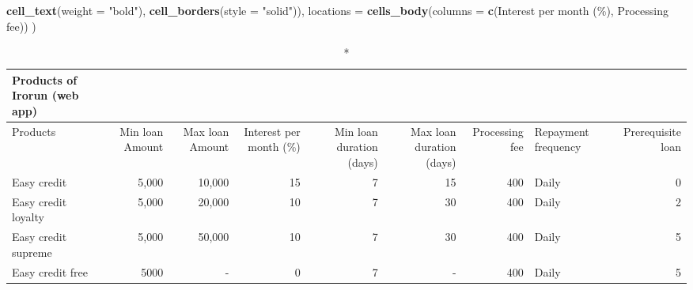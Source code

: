\documentclass[
]{article}
\newenvironment{Shaded}{\begin{snugshade}}{\end{snugshade}}
\newcommand{\AttributeTok}[1]{\textcolor[rgb]{0.13,0.29,0.53}{#1}}
\newcommand{\FunctionTok}[1]{\textcolor[rgb]{0.13,0.29,0.53}{\textbf{#1}}}
\newcommand{\NormalTok}[1]{#1}
\newcommand{\StringTok}[1]{\textcolor[rgb]{0.31,0.60,0.02}{#1}}
\begin{document}
\begin{Shaded}
\begin{Highlighting}[]
                         \FunctionTok{cell\_text}\NormalTok{(}\AttributeTok{weight =} \StringTok{"bold"}\NormalTok{), }\FunctionTok{cell\_borders}\NormalTok{(}\AttributeTok{style =} \StringTok{"solid"}\NormalTok{)),}
            \AttributeTok{locations =} \FunctionTok{cells\_body}\NormalTok{(}\AttributeTok{columns =} \FunctionTok{c}\NormalTok{(}\StringTok{\textasciigrave{}}\AttributeTok{Interest per month (\%)}\StringTok{\textasciigrave{}}\NormalTok{, }\StringTok{\textasciigrave{}}\AttributeTok{Processing fee}\StringTok{\textasciigrave{}}\NormalTok{))}
\NormalTok{            )}
\end{Highlighting}
\end{Shaded}

\begin{longtable}{lrrrrrrlr}
\caption*{
{\large Products of Irorun (web app)}
} \\ 
\toprule
Products & Min loan Amount & Max loan Amount & Interest per month (\%) & Min loan duration (days) & Max loan duration (days) & Processing fee & Repayment frequency & Prerequisite loan \\ 
\midrule
Easy credit & 5,000 & 10,000 & 15 & 7 & 15 & 400 & Daily & 0 \\ 
Easy credit loyalty & 5,000 & 20,000 & 10 & 7 & 30 & 400 & Daily & 2 \\ 
Easy credit supreme & 5,000 & 50,000 & 10 & 7 & 30 & 400 & Daily & 5 \\ 
Easy credit free & 5000 & - & 0 & 7 & - & 400 & Daily & 5 \\ 
\bottomrule
\end{longtable}
\end{document}
